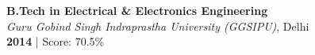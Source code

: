 %
%


\textbf{B.Tech in Electrical \& Electronics Engineering}\\
\emph{Guru Gobind Singh Indraprastha University (GGSIPU)}, Delhi\\
\textbf{2014} | Score: 70.5\%